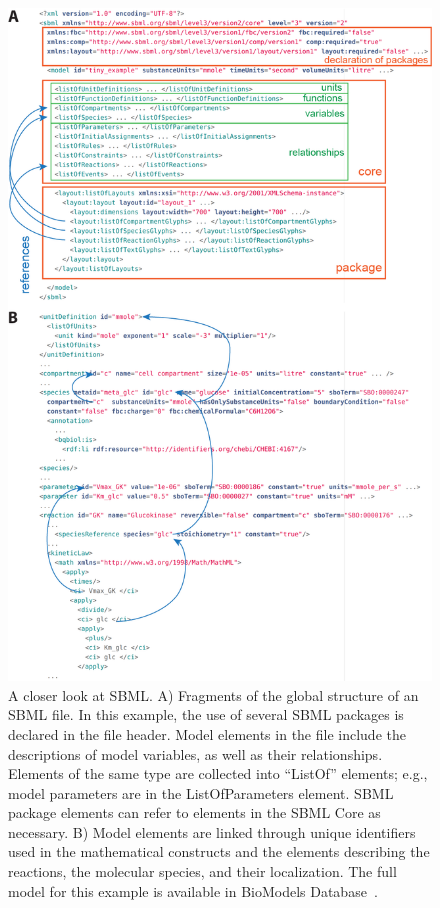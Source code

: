 \documentclass[]{draft-sbml-paper}
\begin{document}
\begin{figure}[htb]
   \center
   \includegraphics[width=.8\textwidth]{res/SBML_XML_example_v03.png}
 \caption{A closer look at SBML. A) Fragments of the global structure of an SBML file. In this example, the use of several SBML packages is declared in the file header. Model elements in the file include the descriptions of model variables, as well as their relationships.  Elements of the same type are collected into ``ListOf'' elements; e.g., model parameters are in the ListOfParameters element. SBML package elements can refer to elements in the SBML Core as necessary. B) Model elements are linked through unique identifiers used in the mathematical constructs and the elements describing the reactions, the molecular species, and their localization. The full model for this example is available in BioModels Database~\citep{chelliah2014biomodels, li2010biomodels}.}
\label{fig:examples-sbml}
\end{figure}


\clearpage
\newpage
\end{document}
